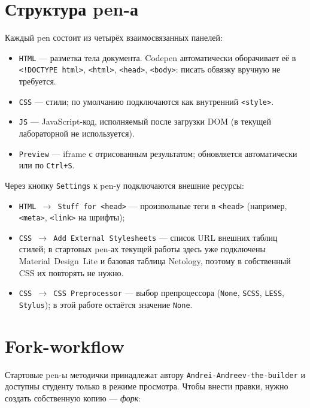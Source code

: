 \section{Структура pen-а}

Каждый pen состоит из четырёх взаимосвязанных панелей:
\begin{itemize}
  \item \texttt{HTML} --- разметка тела документа. Codepen
        автоматически оборачивает её в \texttt{<!DOCTYPE~html>},
        \texttt{<html>}, \texttt{<head>}, \texttt{<body>}: писать
        обвязку вручную не требуется.
  \item \texttt{CSS} --- стили; по умолчанию подключаются как
        внутренний \texttt{<style>}.
  \item \texttt{JS} --- JavaScript-код, исполняемый после загрузки
        DOM (в текущей лабораторной не используется).
  \item \texttt{Preview} --- iframe с отрисованным результатом;
        обновляется автоматически или по \texttt{Ctrl+S}.
\end{itemize}

Через кнопку \texttt{Settings} к pen-у подключаются внешние ресурсы:
\begin{itemize}
  \item \texttt{HTML~\(\rightarrow\)~Stuff~for~<head>} --- произвольные
        теги в \texttt{<head>} (например, \texttt{<meta>}, \texttt{<link>}
        на шрифты);
  \item \texttt{CSS~\(\rightarrow\)~Add~External~Stylesheets} --- список
        URL внешних таблиц стилей; в стартовых pen-ах текущей
        работы здесь уже подключены Material~Design~Lite и базовая
        таблица Netology, поэтому в собственный CSS их повторять
        не нужно.
  \item \texttt{CSS~\(\rightarrow\)~CSS~Preprocessor} --- выбор препроцессора
        (\texttt{None}, \texttt{SCSS}, \texttt{LESS}, \texttt{Stylus});
        в этой работе остаётся значение \texttt{None}.
\end{itemize}

\section{Fork-workflow}

Стартовые pen-ы методички принадлежат автору \texttt{Andrei-Andreev-the-builder}
и доступны студенту только в режиме просмотра. Чтобы внести правки,
нужно создать собственную копию --- \emph{форк}:

